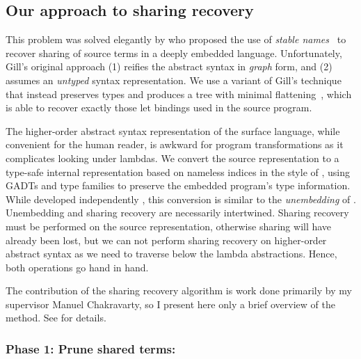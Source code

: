\subsection{Our approach to sharing recovery}

This problem was solved elegantly by \citet{Gill:2009dx} who proposed the use
of \emph{stable names}~\cite{PeytonJones:2000ks} to recover
sharing of source terms in a deeply embedded language. Unfortunately, Gill's
original approach (1) reifies the abstract syntax in \emph{graph} form, and (2)
assumes an \emph{untyped} syntax representation. We use a variant of Gill's
technique that instead preserves types and produces a tree with minimal
flattening~\cite{McDonell:2013wi}, which is able to recover exactly those let
bindings used in the source program.

The higher-order abstract syntax
representation of the surface language, while convenient for the human reader,
is awkward for program transformations as it complicates looking under lambdas.
We convert the source representation to a type-safe internal representation
based on nameless  indices in the style of
\citet{Altenkirch:2003kz}, using GADTs \cite{Jones:2006eh} and type families
\cite{Chakravarty:2005dx,Schrijvers:2008ir} to preserve the embedded program's
type information. While developed independently
\cite{McDonell:2013wi,Chakravarty:2009uo}, this conversion is similar to the
\emph{unembedding} of \citet{Atkey:2009dj}. Unembedding and sharing recovery are
necessarily intertwined. Sharing recovery must be performed on the source
representation, otherwise sharing will have already been lost, but we can not
perform sharing recovery on higher-order abstract syntax as we need to traverse below the lambda abstractions. Hence,
both operations go hand in hand.

The contribution of the sharing recovery algorithm is work done primarily by my supervisor Manuel
Chakravarty, so I present here only a brief overview of the method. See \cite{McDonell:2013wi} for
details.


\subsubsection*{Phase 1: Prune shared terms:}

